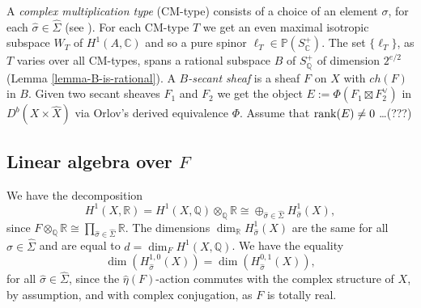 \documentclass[12pt]{amsart}
\numberwithin{equation}{subsection}
\theoremstyle{plain}
\theoremstyle{definition}
\newtheorem{rem}[thm]{Remark}
\newcommand{\CC}{{\mathbb C}}
\newcommand{\QQ}{{\mathbb Q}}
\newcommand{\RR}{{\mathbb R}}
\newcommand{\T}{{\mathcal T}}
\newcommand{\PP}{{\mathbb P}}
\newcommand{\rank}{{\rm rank}}
\newcommand{\End}{{\rm End}}
\begin{document}
{A {\em complex multiplication type} (CM-type) consists of a choice of an element $\sigma$, for each  $\hat{\sigma}\in\hat{\Sigma}$ (see \cite[Sec. 5]{deligne-milne}). 
For each CM-type $T$ we get an even maximal isotropic subspace $W_T$ of $H^1(A,\CC)$ and so a pure spinor $\ell_T\in \PP(S^+_\CC)$.
The set $\{\ell_T\}$, as $T$ varies over all CM-types, spans a rational subspace $B$ of $S^+_\QQ$ of dimension $2^{e/2}$ (Lemma \ref{lemma-B-is-rational}).
A {\em $B$-secant sheaf} is a sheaf $F$ on $X$ with $ch(F)$ in $B$. Given two secant sheaves $F_1$ and $F_2$ we get the object $E:=\Phi(F_1\boxtimes F_2^\vee)$ in $D^b(X\times\hat{X})$ via Orlov's derived equivalence $\Phi$. Assume that $\rank(E)\neq 0$ \dots(???)

% 
\subsection{Linear algebra over $F$}
We have the decomposition 
\[
H^1(X,\RR)=H^1(X,\QQ)\otimes_\QQ\RR\cong \oplus_{\hat{\sigma}\in\hat{\Sigma}} H^1_{\hat{\sigma}}(X),
\]
since
$
F\otimes_\QQ\RR \cong \prod_{\hat{\sigma}\in\hat{\Sigma}}\RR.
$
The dimensions $\dim_\RR H^1_{\hat{\sigma}}(X)$ are the same for all $\hat{\sigma}\in \hat{\Sigma}$ and are equal to $d=\dim_FH^1(X,\QQ)$.
We have the equality
\[
\dim(H^{1,0}_{\hat{\sigma}}(X))=\dim(H^{0,1}_{\hat{\sigma}}(X)),
\]
for all $\hat{\sigma}\in\hat{\Sigma}$, since the $\hat{\eta}(F)$-action commutes with the complex structure of $X$, by assumption, and with complex conjugation, as $F$ is totally real.

}
\end{document}
